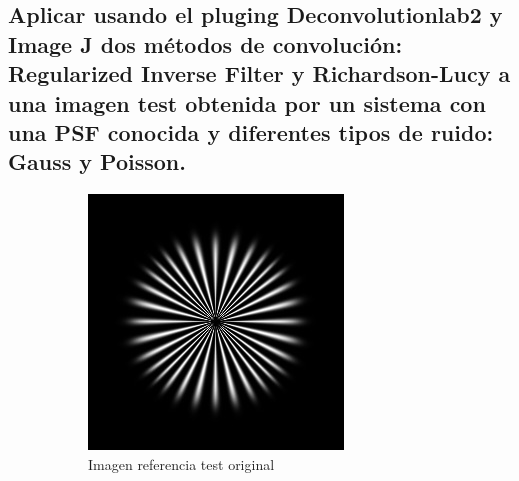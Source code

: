 \documentclass{./packages/optica-article}
\begin{document}
\subsection{Aplicar usando el pluging Deconvolutionlab2 y Image J dos métodos de convolución: Regularized Inverse Filter y Richardson-Lucy a una imagen test obtenida por un sistema con una PSF conocida y diferentes tipos de ruido: Gauss y Poisson.}


\begin{figure}[hbp]
	\centering
	\begin{subfigure}[t]{0.45\textwidth}\centering
		\centering
		\includegraphics[width=\textwidth]{Simulation deconvolution/ref.jpg}
		\caption{Imagen referencia test original}\label{fig:ref}
	\end{subfigure}
	\hfill
	\begin{subfigure}[t]{0.45\textwidth}\centering

\end{subfigure}
\end{figure}
\end{document}
